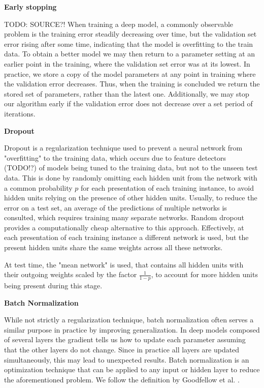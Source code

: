 \textbf{Early stopping}\par
TODO: SOURCE?!
When training a deep model, a commonly observable problem is the training error steadily decreasing over time, but the validation set error rising after some time, indicating that the model is overfitting to the train data. To obtain a better model we may then return to a parameter setting at an earlier point in the training, where the validation set error was at its lowest. In practice, we store a copy of the model parameters at any point in training where the validation error decreases. Thus, when the training is concluded we return the stored set of parameters, rather than the latest one. Additionally, we may stop our algorithm early if the validation error does not decrease over a set period of iterations.\bigskip

\textbf{Dropout}\par
Dropout \cite{hinton2012improving} is a regularization technique used to prevent a neural network from "overfitting" to the training data, which occurs due to feature detectors (TODO!?) of models being tuned to the training data, but not to the unseen test data. This is done by randomly omitting each hidden unit from the network with a common probability $p$ for each presentation of each training instance, to avoid hidden units relying on the presence of other hidden units. Usually, to reduce the error on a test set, an average of the predictions of multiple networks is consulted, which requires training many separate networks. Random dropout provides a computationally cheap alternative to this approach. Effectively, at each presentation of each training instance a different network is used, but the present hidden units share the same weights across all these networks.

At test time, the "mean network" is used, that contains all hidden units with their outgoing weights scaled by the factor $\frac{1}{1-p}$, to account for more hidden units being present during this stage. \bigskip

\textbf{Batch Normalization}\par
While not strictly a regularization technique, batch normalization \cite{ioffe2015batch} often serves a similar purpose in practice by improving generalization.
In deep models composed of several layers the gradient tells us how to update each parameter assuming that the other layers do not change. Since in practice all layers are updated simultaneously, this may lead to unexpected results. Batch normalization is an optimization technique that can be applied to any input or hidden layer to reduce the aforementioned problem. We follow the definition by Goodfellow et al. \cite{Goodfellow-et-al-2016}.

